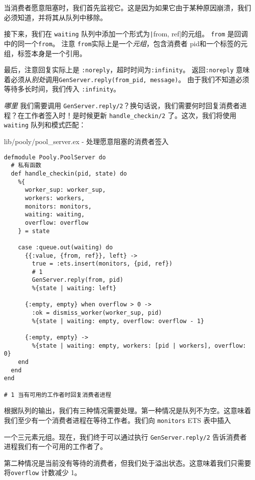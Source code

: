 当消费者愿意阻塞时，我们首先监视它。这是因为如果它由于某种原因崩溃，我们必须知道，并将其从队列中移除。

接下来，我们在 \texttt{waiting} 队列中添加一个形式为\texttt|{from, ref}|的元组。
\texttt{from} 是回调中的同一个\texttt{from}。
注意 \texttt{from}实际上是一个\emph{元组}，包含消费者 pid和一个标签的元组，标签本身是一个引用。

最后，注意回复实际上是 \texttt{:noreply}，超时时间为\texttt{:infinity}。
返回\texttt{:noreply} 意味着必须从\emph{别处}调用\texttt{GenServer.reply(from\_pid, message)}。
由于我们不知道必须等待多长时间，我们传入
\texttt{:infinity}。

\emph{哪里} 我们需要调用
\texttt{GenServer.reply/2}？换句话说，我们需要何时回复消费者进程？在工作者签入时！是时候更新
\texttt{handle\_checkin/2} 了。这次，我们将使用
\texttt{waiting} 队列和模式匹配：

\begin{code}{lib/pooly/pool\_server.ex - 处理愿意阻塞的消费者签入}

\begin{verbatim}
defmodule Pooly.PoolServer do
  # 私有函数
  def handle_checkin(pid, state) do
    %{
      worker_sup: worker_sup,
      workers: workers,
      monitors: monitors,
      waiting: waiting,
      overflow: overflow
    } = state

    case :queue.out(waiting) do
      {{:value, {from, ref}}, left} ->
        true = :ets.insert(monitors, {pid, ref})
        # 1
        GenServer.reply(from, pid)
        %{state | waiting: left}

      {:empty, empty} when overflow > 0 ->
        :ok = dismiss_worker(worker_sup, pid)
        %{state | waiting: empty, overflow: overflow - 1}

      {:empty, empty} ->
        %{state | waiting: empty, workers: [pid | workers], overflow: 0}
    end
  end
end

# 1 当有可用的工作者时回复消费者进程
\end{verbatim}
\end{code}

根据队列的输出，我们有三种情况需要处理。第一种情况是队列不为空。这意味着我们至少有一个消费者进程在等待工作者。我们向
\texttt{monitors} ETS 表中插入

一个三元素元组。现在，我们终于可以通过执行
\texttt{GenServer.reply/2}
告诉消费者进程我们有一个可用的工作者了。

第二种情况是当前没有等待的消费者，但我们处于溢出状态。这意味着我们只需要将\texttt{overflow} 计数减少 1。

